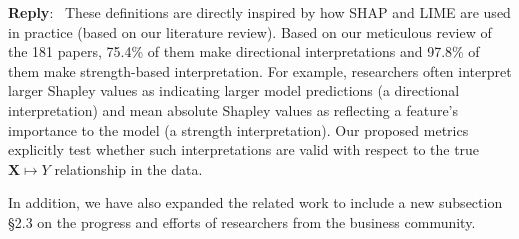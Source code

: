 \documentclass[11pt]{article}
\newcounter{se}[section]
\newenvironment{reply}
 {\par\medskip \noindent \begin{sf}\textbf{Reply}:\ }
 {\medskip \end{sf}}
\begin{document}
\begin{reply}
These definitions are directly inspired by how SHAP and LIME are used in practice (based on our literature review).  Based on our meticulous review of the 181 papers, 75.4\% of them make directional interpretations and 97.8\% of them make strength-based interpretation. For example, researchers often interpret larger Shapley values as indicating larger model predictions (a directional interpretation) and mean absolute Shapley values as reflecting a feature’s importance to the model (a strength interpretation). Our proposed metrics explicitly test whether such interpretations are valid with respect to the true $\mathbf{X} \mapsto Y$ relationship in the data. 

In addition, we have also expanded the related work to include a new subsection \S 2.3 on the progress and efforts of researchers from the business community.

\end{reply}

\end{document}
